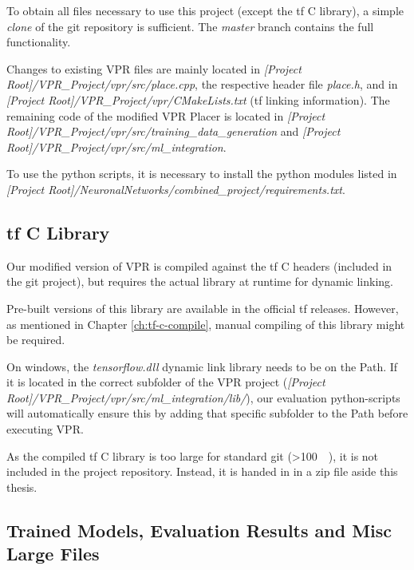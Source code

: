 To obtain all files necessary to use this project (except the \gls{tf} C library), a simple \textit{clone} of the git repository is sufficient. The \textit{master} branch contains the full functionality.

Changes to existing \gls{VPR} files are mainly located in \textit{[Project Root]/VPR\_Project/vpr/src/place.cpp}, the respective header file \textit{place.h}, and in \textit{[Project Root]/VPR\_Project/vpr/CMakeLists.txt} (\gls{tf} linking information). The remaining code of the modified \gls{VPR} Placer is located in \textit{[Project Root]/VPR\_Project/vpr/src/training\_data\_gener}\linebreak\noindent \textit{ation} and \textit{[Project Root]/VPR\_Project/vpr/src/ml\_integration}.

To use the python scripts, it is necessary to install the python modules listed in \textit{[Project Root]/NeuronalNetworks/combined\_project/requireme}\linebreak\noindent \textit{nts.txt}.

\subsection{\gls{tf} C Library}

Our modified version of \gls{VPR} is compiled against the \gls{tf} C headers (included in the git project), but requires the actual library at runtime for dynamic linking.

Pre-built versions of this library are available in the official \gls{tf} releases. However, as mentioned in Chapter \ref{ch:tf-c-compile}, manual compiling of this library might be required.

On windows, the \textit{tensorflow.dll} dynamic link library needs to be on the Path. If it is located in the correct subfolder of the \gls{VPR} project (\textit{[Project Root]/VPR\_Project/vpr/src/ml\_integration/lib/}), our evaluation python-scripts will automatically ensure this by adding that specific subfolder to the Path before executing \gls{VPR}.

As the compiled \gls{tf} C library is too large for standard git (>\SI{100}{\mega\byte}), it is not included in the project repository. Instead, it is handed in in a zip file aside this thesis.

\subsection{Trained Models, Evaluation Results and Misc Large Files}

